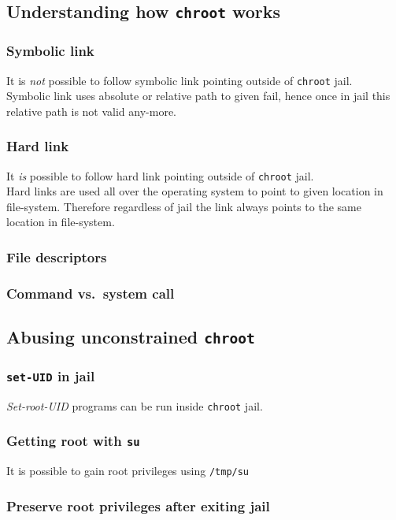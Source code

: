 \documentclass[12pt, a4paper, pdflatex]{article}
\begin{document}
\subsection{Understanding how \texttt{chroot} works}
\subsubsection{Symbolic link}
It is \emph{not} possible to follow symbolic link pointing outside of \texttt{chroot} jail.\\
Symbolic link uses absolute or relative path to given fail, hence once in jail this relative path is not valid any-more.

\subsubsection{Hard link}
It \emph{is} possible to follow hard link pointing outside of \texttt{chroot} jail.\\
Hard links are used all over the operating system to point to given location in file-system. Therefore regardless of jail the link always points to the same location in file-system.

\subsubsection{File descriptors}


\subsubsection{Command vs.\ system call}

\subsection{Abusing unconstrained \texttt{chroot}}
\subsubsection{\texttt{set-UID} in jail}
\emph{Set-root-UID} programs can be run inside \texttt{chroot} jail.

\subsubsection{Getting root with \texttt{su}}
It is possible to gain root privileges using \texttt{/tmp/su}

\subsubsection{Preserve root privileges after exiting jail}
\end{document}
